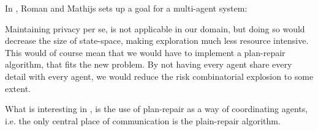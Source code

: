 \documentclass[Main]{subfiles}
\begin{document}
In \cite{VanderKrogt2005}, Roman and Mathijs sets up a goal for a multi-agent system:

Maintaining privacy per se, is not applicable in our domain, but doing so would decrease the size of state-space, 
making exploration much less resource intensive. 
This would of course mean that we would have to implement a plan-repair algorithm, that fits the new problem.
By not having every agent share every detail with every agent, we would reduce the risk combinatorial explosion to some extent.

What is interesting in \cite{VanderKrogt2005}, is the use of plan-repair as a way of coordinating agents, i.e. the only central place of communication is the plain-repair algorithm. 


\end{document}
